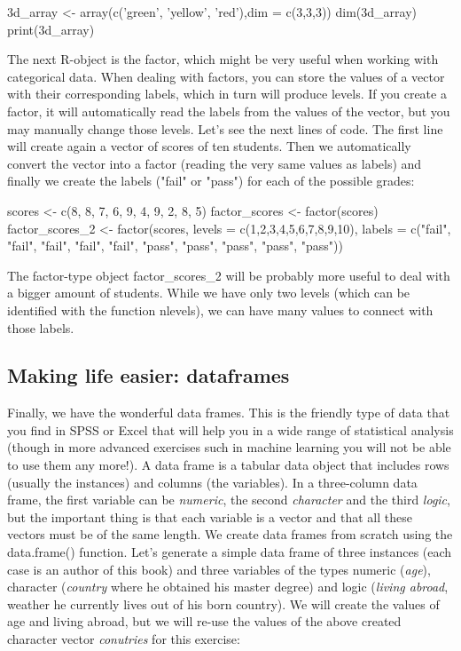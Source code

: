 \begin{exampler}
3d_array <- array(c('green', 'yellow', 'red'),dim = c(3,3,3))
dim(3d_array)
print(3d_array)
\end{exampler}

The next R-object is the factor, which might be very useful when working with categorical data. When dealing with factors, you can store the values of a vector with their corresponding labels, which in turn will produce levels. If you create a factor, it will automatically read the labels from the values of the vector, but you may manually change those levels. Let's see the next lines of code. The first line will create again a vector of scores of ten students. Then we automatically convert the vector into a factor (reading the very same values as labels) and finally we create the labels ("fail" or "pass") for each of the possible grades:

\begin{exampler}
scores <- c(8, 8, 7, 6, 9, 4, 9, 2, 8, 5)
factor_scores <- factor(scores)
factor_scores_2 <- factor(scores, levels = c(1,2,3,4,5,6,7,8,9,10), labels = c("fail", "fail", "fail", "fail", "fail", "pass", "pass", "pass", "pass", "pass"))
\end{exampler}

The factor-type object factor\_scores\_2 will be probably more useful to deal with a bigger amount of students. While we have only two levels (which can be identified with the function nlevels), we can have many values to connect with those labels.


\subsection{Making life easier: dataframes}

Finally, we have the wonderful data frames. This is the friendly type of data that you find in SPSS or Excel that will help you in a wide range of statistical analysis (though in more advanced exercises such in machine learning you will not be able to use them any more!).  A data frame is a tabular data object that includes rows (usually the instances) and columns (the variables). In a three-column data frame, the first variable can be \emph{numeric}, the second \emph{character} and the third \emph{logic}, but the important thing is that each variable is a vector and that all these vectors must be of the same length. We create data frames from scratch using the data.frame() function.  Let’s generate a simple data frame of three instances (each case is an author of this book) and three variables of the types numeric (\emph{age}), character (\emph{country} where he obtained his master degree) and logic (\emph{living abroad}, weather he currently lives out of his born country). We will create the values of age and living abroad, but we will re-use the values of the above created character vector \emph{conutries} for this exercise:


